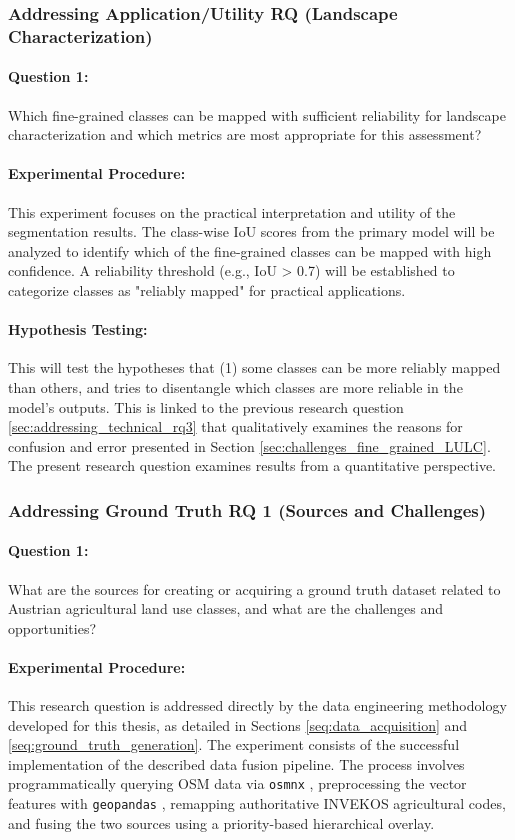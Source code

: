 \documentclass{report}
\begin{document}
\subsubsection{Addressing Application/Utility RQ (Landscape Characterization)}
\label{sec:addressing_app_rq}
\paragraph{Question 1:} Which fine-grained classes can be mapped with sufficient reliability for landscape characterization and which metrics are most appropriate for this assessment?
\paragraph{Experimental Procedure:} This experiment focuses on the practical interpretation and utility of the segmentation results. The class-wise IoU scores from the primary model will be analyzed to identify which of the fine-grained classes can be mapped with high confidence. A reliability threshold (e.g., IoU > 0.7) will be established to categorize classes as "reliably mapped" for practical applications.
\paragraph{Hypothesis Testing:} This will test the hypotheses that (1) some classes can be more reliably mapped than others, and tries to disentangle which classes are more reliable in the model's outputs. This is linked to the previous research question \ref{sec:addressing_technical_rq3} that qualitatively examines the reasons for confusion and error presented in Section \ref{sec:challenges_fine_grained_LULC}. The present research question examines results from a quantitative perspective.

\subsubsection{Addressing Ground Truth RQ 1 (Sources and Challenges)}
\label{sec:addressing_gt_rq1}
\paragraph{Question 1:} What are the sources for creating or acquiring a ground truth dataset related to Austrian agricultural land use classes, and what are the challenges and opportunities?
\paragraph{Experimental Procedure:} This research question is addressed directly by the data engineering methodology developed for this thesis, as detailed in Sections \ref{seq:data_acquisition} and \ref{seq:ground_truth_generation}. The experiment consists of the successful implementation of the described data fusion pipeline. The process involves programmatically querying OSM data via \texttt{osmnx} \parencite{BoeingModelingAnalyzingUrbanNetworksAmenitiesOSMnx2025}, preprocessing the vector features with \texttt{geopandas} \parencite{JordahlEtAlgeopandasgeopandasv0812020}, remapping authoritative INVEKOS agricultural codes, and fusing the two sources using a priority-based hierarchical overlay.
\end{document}

